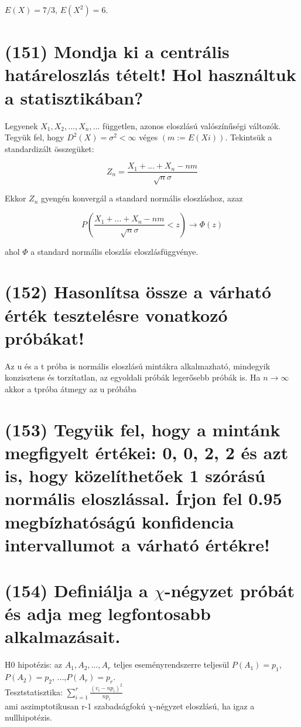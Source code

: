 \documentclass[12p]{article}
\begin{document}
$E(X) = 7/3$, $E(X^2) = 6$.

\section{(151) Mondja ki a centrális határeloszlás tételt! Hol használtuk a statisztikában?}

Legyenek $X_1 , X_2 ,..., X_n ,...$ független, azonos eloszlású valószínűségi változók. Tegyük fel, hogy $D^2(X) = \sigma^2 < \infty$ véges $(m:=E(Xi))$. Tekintsük a standardizált összegüket:

$$Z_n = \frac{X_1 + ... + X_n -nm}{\sqrt{n}\sigma}$$

Ekkor $Z_n$ gyengén konvergál a standard normális eloszláshoz,
azaz

$$P(\frac{X_1 + ... + X_n - nm}{\sqrt{n}\sigma} < z) \rightarrow \Phi(z)$$

ahol $\Phi$ a standard normális eloszlás eloszlásfüggvénye.

\section{(152) Hasonlítsa össze a várható érték tesztelésre vonatkozó próbákat!}

Az u és a t próba is normális eloszlású mintákra alkalmazható, mindegyik konzisztens és torzítatlan, az egyoldali próbák legerősebb próbák is. Ha $n \rightarrow \infty$ akkor a tpróba átmegy az u próbába

\section{(153) Tegyük fel, hogy a mintánk megfigyelt értékei: 0, 0, 2, 2 és azt is, hogy közelíthetőek 1 szórású normális eloszlással. Írjon fel 0.95 megbízhatóságú konfidencia intervallumot a várható értékre!}

\section{(154) Definiálja a $\chi$-négyzet próbát és adja meg legfontosabb alkalmazásait.}

H0 hipotézis: az $A_1, A_2, ..., A_r$ teljes eseményrendszerre teljesül $P(A_1)=p_1$, $P(A_2)=p_2$, ...,$P(A_r)=p_r$.\\
Tesztstatisztika: $\displaystyle{ \sum^r_{i=1} \frac{(v_i - np_i)^2}{np_i}}$\\
ami aszimptotikusan r-1 szabadságfokú $\chi$-négyzet eloszlású, ha igaz a nullhipotézis. 
\end{document}
